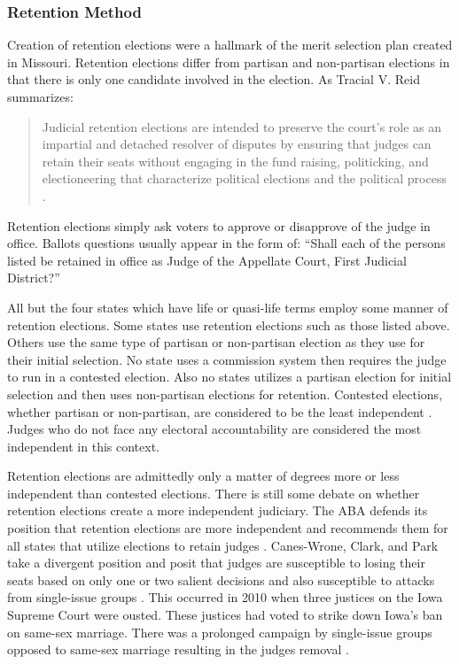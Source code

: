 \documentclass[12pt]{article}
\begin{document}
\subsubsection*{Retention Method}
Creation of retention elections were a hallmark of the merit selection plan created in Missouri. Retention elections differ from partisan and non-partisan elections in that there is only one candidate involved in the election. As Tracial V. Reid summarizes: \begin{quote}Judicial retention elections are intended to preserve the court’s role as an impartial and detached resolver of disputes by ensuring that judges can retain their seats without engaging in the fund raising, politicking, and electioneering that characterize political elections and the political process \citep{Reid1999}.\end{quote}  Retention elections simply ask voters to approve or disapprove of the judge in office. Ballots questions usually appear in the form of: ``Shall each of the persons listed be retained in office as Judge of the Appellate Court, First Judicial District?''

All but the four states which have life or quasi-life terms employ some manner of retention elections. Some states use retention elections such as those listed above. Others use the same type of partisan or non-partisan election as they use for their initial selection. No state uses a commission system then requires the judge to run in a contested election. Also no states utilizes a partisan election for initial selection and then uses non-partisan elections for retention.  Contested elections, whether partisan or non-partisan, are considered to be the least independent \citep{Choi2010,ABA2003,Canes-Wrone2012}. Judges who do not face any electoral accountability are considered the most independent in this context.

Retention elections are admittedly only a matter of degrees more or less independent than contested elections. There is still some debate on whether retention elections create a more independent judiciary. The ABA defends its position that retention elections are more independent and recommends them for all states that utilize elections to retain judges \citep{ABA2003}.  Canes-Wrone, Clark, and Park take a divergent position and posit that judges are susceptible to losing their seats based on only one or two salient decisions and also susceptible to attacks from single-issue groups \citep{Canes-Wrone2012}.  This occurred in 2010 when three justices on the Iowa Supreme Court were ousted. These justices had voted to strike down Iowa’s ban on same-sex marriage. There was a prolonged campaign by single-issue groups opposed to same-sex marriage resulting in the judges removal \citep{Iowa2010}.
\end{document}
